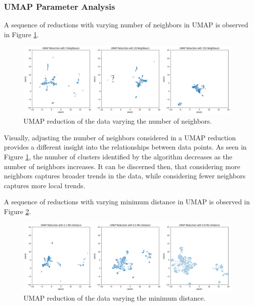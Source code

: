 \documentclass[11pt]{article}
\begin{document}
\subsubsection*{UMAP Parameter Analysis}
A sequence of reductions with varying number of neighbors in UMAP is observed in Figure \ref{fig:UMAP_vary}.

\begin{figure}[H]
    \centering
    \includegraphics[width=\textwidth]{Images/UMAP_vary.png}
    \caption{UMAP reduction of the data varying the number of neighbors.}
    \label{fig:UMAP_vary}
\end{figure}

\vspace{-0.5cm}

Visually, adjusting the number of neighbors considered in a UMAP reduction provides a different insight into the relationships between data points. As seen in Figure \ref{fig:UMAP_vary}, the number of clusters identified by the algorithm decreases as the number of neighbors increases. It can be discerned then, that considering more neighbors captures broader trends in the data, while considering fewer neighbors captures more local trends.

A sequence of reductions with varying minimum distance in UMAP is observed in Figure \ref{fig:UMAP_vary2}.

\begin{figure}[H]
    \centering
    \includegraphics[width=\textwidth]{Images/UMAP_vary2.png}
    \caption{UMAP reduction of the data varying the minimum distance.}
    \label{fig:UMAP_vary2}
\end{figure}
\end{document}
